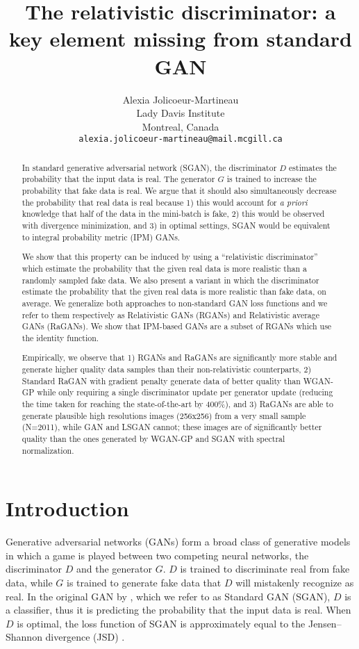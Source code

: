 \documentclass{article}
\title{The relativistic discriminator: a key element missing from standard GAN}
\author{
  Alexia Jolicoeur-Martineau \\
  Lady Davis Institute\\
  Montreal, Canada\\
  \texttt{alexia.jolicoeur-martineau@mail.mcgill.ca} \\
}
\begin{document}
\maketitle

\begin{abstract}
	
	In standard generative adversarial network (SGAN), the discriminator $D$ estimates the probability that the input data is real. The generator $G$ is trained to increase the probability that fake data is real. We argue that it should also simultaneously decrease the probability that real data is real because 1) this would account for \textit{a priori} knowledge that half of the data in the mini-batch is fake, 2) this would be observed with divergence minimization, and 3) in optimal settings, SGAN would be equivalent to integral probability metric (IPM) GANs. 

	We show that this property can be induced by using a “relativistic discriminator” which estimate the probability that the given real data is more realistic than a randomly sampled fake data. We also present a variant in which the discriminator estimate the probability that the given real data is more realistic than fake data, on average. We generalize both approaches to non-standard GAN loss functions and we refer to them respectively as Relativistic GANs (RGANs) and Relativistic average GANs (RaGANs). We show that IPM-based GANs are a subset of RGANs which use the identity function.
	
	Empirically, we observe that 1) RGANs and RaGANs are significantly more stable and generate higher quality data samples than their non-relativistic counterparts, 2) Standard RaGAN with gradient penalty generate data of better quality than WGAN-GP while only requiring a single discriminator update per generator update (reducing the time taken for reaching the state-of-the-art by 400\%), and 3) RaGANs are able to generate plausible high resolutions images (256x256) from a very small sample (N=2011), while GAN and LSGAN cannot; these images are of significantly better quality than the ones generated by WGAN-GP and SGAN with spectral normalization. 

\end{abstract}

\section{Introduction}

Generative adversarial networks (GANs) \citep{hong2017generative} form a broad class of generative models in which a game is played between two competing neural networks, the discriminator $D$ and the generator $G$. $D$ is trained to discriminate real from fake data, while $G$ is trained to generate fake data that $D$ will mistakenly recognize as real. In the original GAN by \citet{GAN}, which we refer to as Standard GAN (SGAN), $D$ is a classifier, thus it is predicting the probability that the input data is real. When $D$ is optimal, the loss function of SGAN is approximately equal to the Jensen–Shannon divergence (JSD) \citep{GAN}. 
\end{document}
